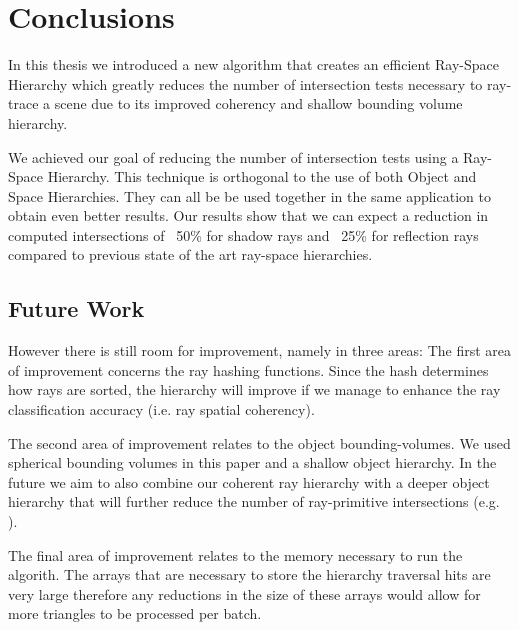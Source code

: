 
\chapter{Conclusions}
\label{chapter:conclusions}

In this thesis we introduced a new algorithm that creates an efficient Ray-Space Hierarchy which greatly reduces the number of intersection tests necessary to ray-trace a scene due to its improved coherency and shallow bounding volume hierarchy.

\medskip

We achieved our goal of reducing the number of intersection tests using a Ray-Space Hierarchy. This technique is orthogonal to the use of both Object and Space Hierarchies. They can all be be used together in the same application to obtain even better results. Our results show that we can expect a reduction in computed intersections of ~50\% for shadow rays and ~25\% for reflection rays compared to previous state of the art ray-space hierarchies.

\section{Future Work}
\label{section:future-work}

However there is still room for improvement, namely in three areas: The first area of improvement concerns the ray hashing functions. Since the hash determines how rays are sorted, the hierarchy will improve if we manage to enhance the ray classification accuracy (i.e. ray spatial coherency).

\medskip

The second area of improvement relates to the object bounding-volumes. We used spherical bounding volumes in this paper and a shallow object hierarchy. In the future we aim to also combine our coherent ray hierarchy with a deeper object hierarchy that will further reduce the number of ray-primitive intersections (e.g. \cite{Bradshaw04}).

\medskip

The final area of improvement relates to the memory necessary to run the algorith. The arrays that are necessary to store the hierarchy traversal hits are very large therefore any reductions in the size of these arrays would allow for more triangles to be processed per batch.